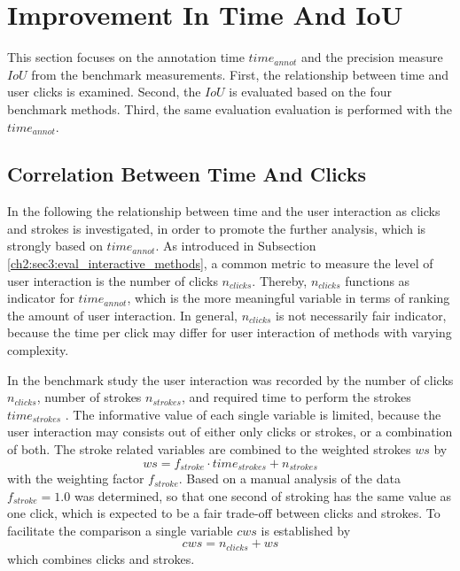 
\section{Improvement In Time And IoU}\label{ord:ch5:sec1}

This section focuses on the annotation time $time_{annot}$ and the precision measure $IoU$ from the benchmark measurements.
First, the relationship between time and user clicks is examined.
Second, the $IoU$ is evaluated based on the four benchmark methods.
Third, the same evaluation evaluation is performed with the $time_{annot}$. 


\subsection{Correlation Between Time And Clicks}\label{ord:ch5:sec1:subsec1}

In the following the relationship between time and the user interaction as clicks and strokes is investigated, in order to promote the further analysis, which is strongly based on $time_{annot}$. 
As introduced in Subsection \ref{ch2:sec3:eval_interactive_methods}, a common metric to measure the level of user interaction is the number of clicks $n_{clicks}$.
Thereby, $n_{clicks}$ functions as indicator for $time_{annot}$, which is the more meaningful variable in terms of ranking the amount of user interaction.
In general, $n_{clicks}$ is not necessarily fair indicator, because the time per click may differ for user interaction of methods with varying complexity.

In the benchmark study the user interaction was recorded by the number of clicks $n_{clicks}$, number of strokes $n_{strokes}$, and required time to perform the strokes $time_{strokes}$ .
The informative value of each single variable is limited, because the user interaction may consists out of either only clicks or strokes, or a combination of both.
The stroke related variables are combined to the weighted strokes $ ws $ by
\begin{equation} \label{equ:ws}
	ws = f_{stroke} \cdot time_{strokes} + n_{strokes} 
\end{equation}
with the weighting factor $ f_{stroke} $.
Based on a manual analysis of the data $ f_{stroke} = 1.0 $ was determined, so that one second of stroking has the same value as one click, which is expected to be a fair trade-off between clicks and strokes.
To facilitate the comparison a single variable $ cws $ is established by 
\begin{equation}
	cws = n_{clicks} + ws
\end{equation}
which combines clicks and strokes.

